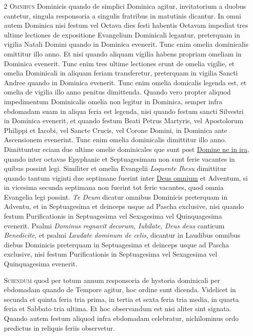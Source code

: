 \begin{multicols*}{2}
{\color{Red} }
\lettrine[lines=2]{\zallmancaps \color{Red} O}{mnibus} Dominicis quando de simplici Dominica agitur, invitatorium a duobus cantetur, singula responsoria a singulis fratribus in matutinis dicantur.
In omni autem Dominica nisi festum vel Octava dies festi habentis Octavam impediat tres ultime lectiones de expositione Evangelium Dominicali legantur, preterquam in vigilia Natali Domini quando in Dominica evenerit.
Tunc enim omelia dominicalis omittitur illo anno. Et nisi quando aliquam vigilia habens propriam omeliam in Dominica evenerit. Tunc enim tres ultime lectiones erunt de omelia vigilie, et omelia Dominicali in aliquam feriam transferetur, preterquam in vigilia Sancti Andree quando in Dominica evenerit. Tunc enim omelia domicalis legenda est, et omelia de vigilia illo anno penitus dimittenda.
Quando vero propter aliquod impedimentum Dominicalis omelia non legitur in Dominica, semper infra ebdomadam suam in aliqua feria est legenda, nisi quando festum sancti Silvestri in Dominica evenerit, et quando festum Beati Petrus Martyris, vel Apostolorum Philippi et Iacobi, vel Sancte Crucis, vel Corone Domini, in Dominica ante Ascensionem evenerint. Tunc enim omelia dominicalis dimittitur illo anno. Dimittuntur eciam due ultime omelie dominicales que sunt post \hyperlink{domine-ne-in-ira}{Domine ne in ira}, quando inter octavas Epyphanie et Septuagesimam non sunt ferie vacantes in quibus possint legi. Similiter et omelia Evangelii \textit{Loquente Ihesu} dimittitur quando tantum viginti due septimane fuerint inter \hyperlink{deus-omnium}{Deus omnium} et Adventum, si in vicesima secunda septimana non fuerint tot ferie vacantes, quod omnia Evangelia legi possint.
\textit{Te Deum} dicatur omnibus Dominicis preterquam in Adventu, et in Septuagesima et deinceps usque ad Pascha exclusive, nisi quando festum Purificationis in Septuagesima vel Sexagesima vel Quinquagesima evenerit.
Psalmi \textit{Dominus regnavit decorum, Iubilate, Deus deus} canticum \textit{Benedicite}, et psalmi \textit{Laudate dominum de celis}, dicantur in Laudibus omnibus diebus Dominicis preterquam in Septuagesima et deinceps usque ad Pascha exclusive, nisi festum Purificationis in Septuagesima vel Sexagesima vel Quinquagesima evenerit.

{\color{Red} }
\lettrine[lines=2]{\zallmancaps \color{Blue} S}{ciendum} quod per totum annum responsoria de hystoria dominicali per ebdomadam quando de Tempore agitur, hoc ordine sunt dicenda. Videlicet in secunda et quinta feria tria prima, in tertia et sexta feria tria media, in quarta feria et Sabbato tria ultima. Et hoc observandum est nisi aliter sint signata. Quando autem festum aliquod infra ebdomadam celebratur, nichilominus ordo predictus in reliquis feriis observetur.


\end{multicols*}
